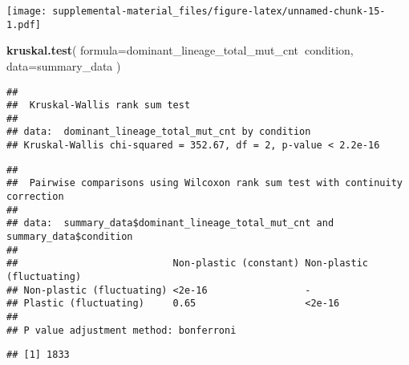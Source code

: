 \documentclass[]{book}
\newenvironment{Shaded}{\begin{snugshade}}{\end{snugshade}}
\newcommand{\DataTypeTok}[1]{\textcolor[rgb]{0.13,0.29,0.53}{#1}}
\newcommand{\KeywordTok}[1]{\textcolor[rgb]{0.13,0.29,0.53}{\textbf{#1}}}
\newcommand{\NormalTok}[1]{#1}
\newcommand{\OperatorTok}[1]{\textcolor[rgb]{0.81,0.36,0.00}{\textbf{#1}}}
\newcommand{\StringTok}[1]{\textcolor[rgb]{0.31,0.60,0.02}{#1}}
\begin{document}
\texttt{[image: supplemental-material\_files/figure-latex/unnamed-chunk-15-1.pdf]}

\begin{Shaded}
\begin{Highlighting}[]
\KeywordTok{kruskal.test}\NormalTok{(}
  \DataTypeTok{formula=}\NormalTok{dominant_lineage_total_mut_cnt}\OperatorTok{~}\NormalTok{condition,}
  \DataTypeTok{data=}\NormalTok{summary_data}
\NormalTok{)}
\end{Highlighting}
\end{Shaded}

\begin{verbatim}
## 
##  Kruskal-Wallis rank sum test
## 
## data:  dominant_lineage_total_mut_cnt by condition
## Kruskal-Wallis chi-squared = 352.67, df = 2, p-value < 2.2e-16
\end{verbatim}

\begin{Shaded}
\end{Shaded}

\begin{verbatim}
## 
##  Pairwise comparisons using Wilcoxon rank sum test with continuity correction 
## 
## data:  summary_data$dominant_lineage_total_mut_cnt and summary_data$condition 
## 
##                           Non-plastic (constant) Non-plastic (fluctuating)
## Non-plastic (fluctuating) <2e-16                 -                        
## Plastic (fluctuating)     0.65                   <2e-16                   
## 
## P value adjustment method: bonferroni
\end{verbatim}

\begin{Shaded}
\end{Shaded}

\begin{verbatim}
## [1] 1833
\end{verbatim}
\end{document}
